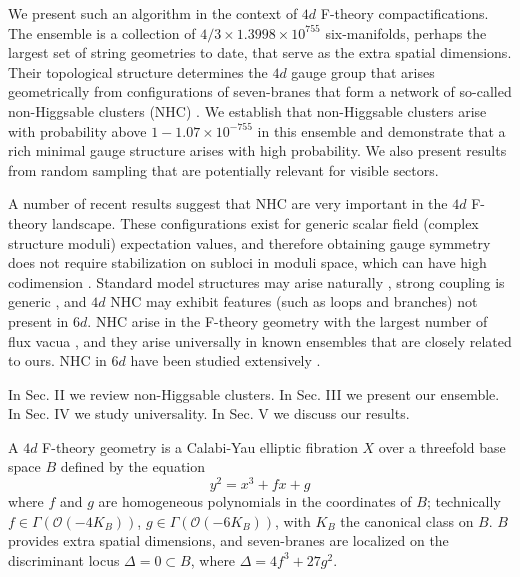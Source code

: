\documentclass[aps,prl,twocolumn, superscriptaddress,groupedaddress,nofootinbib]{revtex4-1}
\begin{document}
We present such an algorithm in the context of $4d$ F-theory \cite{Vafa:1996xn,*Morrison:1996pp,*Morrison:1996pp}
compactifications. The ensemble is a collection of
$4/3\times 1.3998\times 10^{755}$ six-manifolds, perhaps the largest set
of string geometries to date, that serve as the extra spatial dimensions. Their topological structure determines the $4d$ gauge group that arises 
geometrically from
configurations of seven-branes that form a network of so-called non-Higgsable
clusters (NHC) \cite{Morrison:2012np}. We establish that non-Higgsable clusters arise with
probability above $1-1.07\times 10^{-755}$ in this ensemble and demonstrate that a rich minimal gauge structure arises with high probability. We also
present results from random sampling that are potentially relevant for
visible sectors.

A number of recent results suggest that NHC are very
important in the $4d$ F-theory landscape. These configurations exist for generic
 scalar field (complex structure moduli) expectation values, and therefore obtaining
gauge symmetry does not require \cite{Grassi:2014zxa} stabilization on subloci in 
moduli space, which can have high codimension \cite{Braun:2014xka,*Watari:2015ysa,*Halverson:2016tve}. Standard model structures may arise naturally \cite{Grassi:2014zxa}, strong coupling is generic \cite{Halverson:2016vwx}, and $4d$ NHC may exhibit features \cite{Morrison:2014lca} (such as loops and branches) not present
in $6d$. NHC arise in the F-theory geometry with the largest number of flux
vacua \cite{Taylor:2015xtz}, and they arise universally in known ensembles 
\cite{Halverson:2015jua,*Taylor:2015ppa} that are closely related to ours.
NHC in $6d$ have been studied extensively \cite{Morrison:2012np,Morrison:2012js,*Taylor:2012dr,*Morrison:2014era,*Martini:2014iza,*Johnson:2014xpa,*Taylor:2015isa}.

In Sec. II we review non-Higgsable clusters. In Sec. III we present our ensemble.
In Sec. IV we study universality. In Sec. V we discuss our results.


\vspace{.2cm}
A $4d$ F-theory geometry is a Calabi-Yau elliptic fibration
$X$ over a threefold base space $B$ defined by the equation
\begin{equation}
y^2=x^3+f x + g
\end{equation}
where $f$ and $g$ are homogeneous polynomials in the coordinates
of $B$; technically $f\in \Gamma(\mathcal{O}(-4K_B))$, $g\in \Gamma(\mathcal{O}(-6K_B))$,
with $K_B$ the canonical class on $B$. $B$ provides extra spatial dimensions, and seven-branes are localized on the discriminant locus
$\Delta=0\subset B$, where $\Delta = 4f^3+27g^2$.
\end{document}
